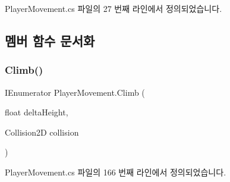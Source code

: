 Player\+Movement.\+cs 파일의 27 번째 라인에서 정의되었습니다.


\begin{DoxyCode}{0}

\end{DoxyCode}


\subsection{멤버 함수 문서화}
\mbox{\label{class_player_movement_a6ff1fb59f41c43876325fe8eee66a2cc}} 
\subsubsection{\texorpdfstring{Climb()}{Climb()}}
{\footnotesize\ttfamily I\+Enumerator Player\+Movement.\+Climb (\begin{DoxyParamCaption}\item[{float}]{delta\+Height,  }\item[{Collision2D}]{collision }\end{DoxyParamCaption})\hspace{0.3cm}{\ttfamily [private]}}



Player\+Movement.\+cs 파일의 166 번째 라인에서 정의되었습니다.


